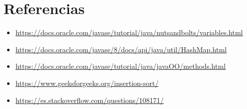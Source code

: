 \documentclass{article}
\begin{document}

\section{Referencias}
\begin{itemize}			
    \item \url{https://docs.oracle.com/javase/tutorial/java/nutsandbolts/variables.html}
    \item \url{https://docs.oracle.com/javase/8/docs/api/java/util/HashMap.html}
    \item \url{https://docs.oracle.com/javase/tutorial/java/javaOO/methods.html}
    \item \url{https://www.geeksforgeeks.org/insertion-sort/}
    \item \url{https://es.stackoverflow.com/questions/108171/}
\end{itemize}	
	
%
%
%
\end{document}
